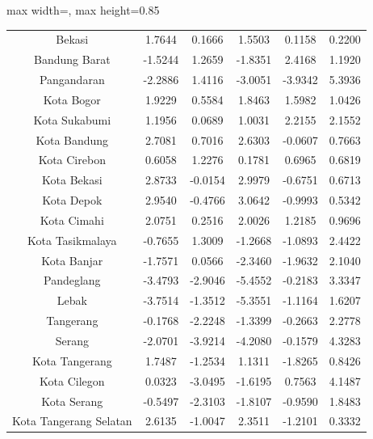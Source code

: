 \begin{table}[H]
\begin{adjustbox}{max width=\textwidth, max height=0.85\textheight}
\begin{tabular}{|c|c|c|c|c|c|}
Bekasi & 1.7644 & 0.1666 & 1.5503 & 0.1158 & 0.2200 \\
Bandung Barat & -1.5244 & 1.2659 & -1.8351 & 2.4168 & 1.1920 \\
Pangandaran & -2.2886 & 1.4116 & -3.0051 & -3.9342 & 5.3936 \\
Kota Bogor & 1.9229 & 0.5584 & 1.8463 & 1.5982 & 1.0426 \\
Kota Sukabumi & 1.1956 & 0.0689 & 1.0031 & 2.2155 & 2.1552 \\
Kota Bandung & 2.7081 & 0.7016 & 2.6303 & -0.0607 & 0.7663 \\
Kota Cirebon & 0.6058 & 1.2276 & 0.1781 & 0.6965 & 0.6819 \\
Kota Bekasi & 2.8733 & -0.0154 & 2.9979 & -0.6751 & 0.6713 \\
Kota Depok & 2.9540 & -0.4766 & 3.0642 & -0.9993 & 0.5342 \\
Kota Cimahi & 2.0751 & 0.2516 & 2.0026 & 1.2185 & 0.9696 \\
Kota Tasikmalaya & -0.7655 & 1.3009 & -1.2668 & -1.0893 & 2.4422 \\
Kota Banjar & -1.7571 & 0.0566 & -2.3460 & -1.9632 & 2.1040 \\
Pandeglang & -3.4793 & -2.9046 & -5.4552 & -0.2183 & 3.3347 \\
Lebak & -3.7514 & -1.3512 & -5.3551 & -1.1164 & 1.6207 \\
Tangerang & -0.1768 & -2.2248 & -1.3399 & -0.2663 & 2.2778 \\
Serang & -2.0701 & -3.9214 & -4.2080 & -0.1579 & 4.3283 \\
Kota Tangerang & 1.7487 & -1.2534 & 1.1311 & -1.8265 & 0.8426 \\
Kota Cilegon & 0.0323 & -3.0495 & -1.6195 & 0.7563 & 4.1487 \\
Kota Serang & -0.5497 & -2.3103 & -1.8107 & -0.9590 & 1.8483 \\
Kota Tangerang Selatan & 2.6135 & -1.0047 & 2.3511 & -1.2101 & 0.3332 \\
\hline
\end{tabular}
\end{adjustbox}
\end{table}